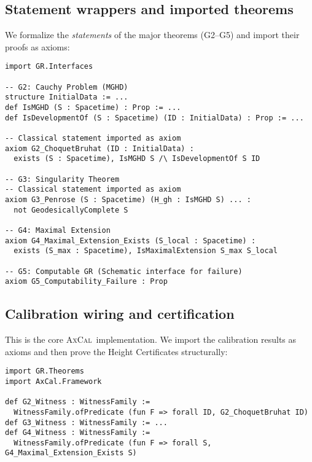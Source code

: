 \documentclass[11pt]{article}
\theoremstyle{definition}
\theoremstyle{remark}
\newcommand{\AxCal}{\textsc{AxCal}}
\begin{document}
\subsection{Statement wrappers and imported theorems}

We formalize the \emph{statements} of the major theorems (G2--G5) and import their proofs as axioms:

\begin{lstlisting}[caption={GR/Theorems.lean}]
import GR.Interfaces

-- G2: Cauchy Problem (MGHD)
structure InitialData := ...
def IsMGHD (S : Spacetime) : Prop := ...
def IsDevelopmentOf (S : Spacetime) (ID : InitialData) : Prop := ...

-- Classical statement imported as axiom
axiom G2_ChoquetBruhat (ID : InitialData) :
  exists (S : Spacetime), IsMGHD S /\ IsDevelopmentOf S ID

-- G3: Singularity Theorem
-- Classical statement imported as axiom
axiom G3_Penrose (S : Spacetime) (H_gh : IsMGHD S) ... :
  not GeodesicallyComplete S

-- G4: Maximal Extension
axiom G4_Maximal_Extension_Exists (S_local : Spacetime) :
  exists (S_max : Spacetime), IsMaximalExtension S_max S_local

-- G5: Computable GR (Schematic interface for failure)
axiom G5_Computability_Failure : Prop
\end{lstlisting}

\subsection{Calibration wiring and certification}

This is the core \AxCal\ implementation. We import the calibration results as axioms and then prove the Height Certificates structurally:

\begin{lstlisting}[caption={Calibration/GR\_Witnesses.lean}]
import GR.Theorems
import AxCal.Framework

def G2_Witness : WitnessFamily := 
  WitnessFamily.ofPredicate (fun F => forall ID, G2_ChoquetBruhat ID)
def G3_Witness : WitnessFamily := ...
def G4_Witness : WitnessFamily := 
  WitnessFamily.ofPredicate (fun F => forall S, G4_Maximal_Extension_Exists S)
\end{lstlisting}
\end{document}
